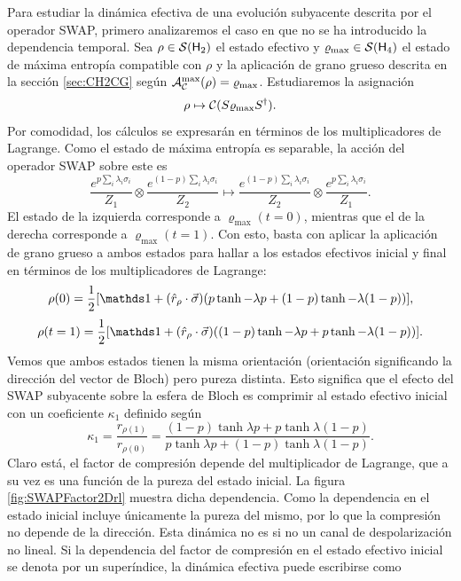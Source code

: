 Para estudiar la dinámica efectiva de una evolución subyacente descrita por el operador SWAP, primero analizaremos el caso en que no se ha introducido la dependencia temporal. Sea $\rho\in\mathcal{S}({\sf H}_{2})$ el estado efectivo y $\varrho_{\max}\in\mathcal{S}({\sf H}_{4})$ el estado de máxima entropía compatible con $\rho$ y la aplicación de grano grueso descrita en la sección \ref{sec:CH2CG} según $\mathcal{A}_{\mathcal{C}}^{\max}(\rho)=\varrho_{\max}$. Estudiaremos la asignación
\begin{equation}
  \rho\mapsto \mathcal{C}(S \varrho_{\max} S^{\dag}).
\end{equation}
Por comodidad, los cálculos se expresarán en términos de los multiplicadores de Lagrange. Como el estado de máxima entropía es separable, la acción del operador SWAP sobre este es
\begin{equation*}
  \frac{e^{p\sum_{i}\lambda_{i}\sigma_{i}}}{Z_{1}} \otimes \frac{e^{(1-p)\sum_{i}\lambda_{i}\sigma_{i}}}{Z_{2}}\mapsto\frac{e^{(1-p)\sum_{i}\lambda_{i}\sigma_{i}}}{Z_{2}}\otimes\frac{e^{p\sum_{i}\lambda_{i}\sigma_{i}}}{Z_{1}}.
\end{equation*}
El estado de la izquierda corresponde a $\varrho_{\max}(t=0)$, mientras que el de la derecha corresponde a $\varrho_{\max}(t=1)$. Con esto, basta con aplicar la aplicación de grano grueso a ambos estados para hallar a los estados efectivos inicial y final en términos de los multiplicadores de Lagrange:
\begin{equation}
\rho(0)=\frac{1}{2}[\Id+(\hat{r}_{\rho}\cdot\vec{\sigma})(p\tanh{-\lambda p}+(1-p)\tanh{-\lambda (1-p)})],
\end{equation}
\begin{equation}
\rho(t=1)=\frac{1}{2}[\Id+(\hat{r}_{\rho}\cdot\vec{\sigma})((1-p)\tanh{-\lambda p}+p\tanh{-\lambda (1-p)})].
\end{equation}
Vemos que ambos estados tienen la misma orientación (orientación significando la dirección del vector de Bloch) pero pureza distinta. Esto significa que el efecto del \textsc{SWAP} subyacente sobre la esfera de Bloch es comprimir al estado efectivo inicial con un coeficiente $\kappa_{1}$ definido según
\begin{equation}\label{eq:SWAPFactor}
  \kappa_{1}=\frac{r_{\rho(1)}}{r_{\rho(0)}}=\frac{(1-p)\tanh{\lambda p}+p\tanh{\lambda (1-p)}}{
    p\tanh{\lambda p}+(1-p)\tanh{\lambda (1-p)}}.
\end{equation}
Claro está, el factor de compresión depende del multiplicador de Lagrange, que a su vez es una función de la pureza del estado inicial. La figura \ref{fig:SWAPFactor2Drl} muestra dicha dependencia. Como la dependencia en el estado inicial incluye únicamente la pureza del mismo, por lo que la compresión no depende de la dirección. Esta dinámica no es si no un canal de despolarización no lineal. Si la dependencia del factor de compresión en el estado efectivo inicial se denota por un superíndice, la dinámica efectiva puede escribirse como
